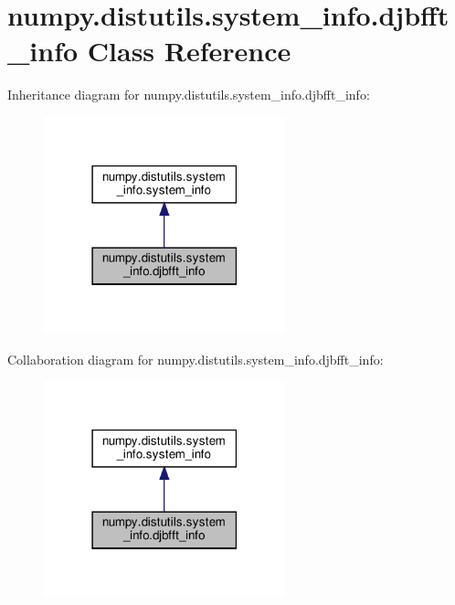 \hypertarget{classnumpy_1_1distutils_1_1system__info_1_1djbfft__info}{}\section{numpy.\+distutils.\+system\+\_\+info.\+djbfft\+\_\+info Class Reference}
\label{classnumpy_1_1distutils_1_1system__info_1_1djbfft__info}


Inheritance diagram for numpy.\+distutils.\+system\+\_\+info.\+djbfft\+\_\+info\+:
\nopagebreak
\begin{figure}[H]
\begin{center}
\leavevmode
\includegraphics[width=198pt]{classnumpy_1_1distutils_1_1system__info_1_1djbfft__info__inherit__graph}
\end{center}
\end{figure}


Collaboration diagram for numpy.\+distutils.\+system\+\_\+info.\+djbfft\+\_\+info\+:
\nopagebreak
\begin{figure}[H]
\begin{center}
\leavevmode
\includegraphics[width=198pt]{classnumpy_1_1distutils_1_1system__info_1_1djbfft__info__coll__graph}
\end{center}
\end{figure}
